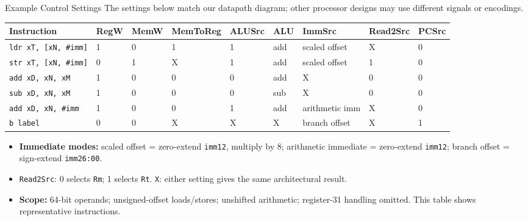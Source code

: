\documentclass[aspectratio=169,11pt,t]{beamer}
\newcommand{\key}[1]{\textbf{#1}}
\newcommand{\code}[1]{\texttt{#1}}
\begin{document}
\begin{frame}{Example Control Settings}
\scriptsize
The settings below match our datapath diagram; other processor designs may use different signals or encodings.
\begin{center}
\renewcommand{\arraystretch}{1.28}
\setlength{\tabcolsep}{5pt}
\begin{adjustbox}{max width=\textwidth}
\begin{tabular}{lllllllll}
\toprule
\rowcolor{white}
\textbf{Instruction} & \textbf{RegW} & \textbf{MemW} & \textbf{MemToReg} & \textbf{ALUSrc} & \textbf{ALU} & \textbf{ImmSrc} & \textbf{Read2Src} & \textbf{PCSrc} \\
\midrule
\code{ldr xT, [xN, \#imm]} & 1 & 0 & 1 & 1 & add & scaled offset & X & 0 \\
\code{str xT, [xN, \#imm]} & 0 & 1 & X & 1 & add & scaled offset & 1 & 0 \\
\code{add xD, xN, xM} & 1 & 0 & 0 & 0 & add & X & 0 & 0 \\
\code{sub xD, xN, xM} & 1 & 0 & 0 & 0 & sub & X & 0 & 0 \\
\code{add xD, xN, \#imm} & 1 & 0 & 0 & 1 & add & arithmetic imm & X & 0 \\
\code{b label} & 0 & 0 & X & X & X & branch offset & X & 1 \\
\bottomrule
\end{tabular}
\end{adjustbox}
\end{center}
\vspace{0.12cm}
\scriptsize
\begin{itemize}\setlength{\itemsep}{3pt}
\item \key{Immediate modes:} scaled offset = zero-extend \code{imm12}, multiply by 8; arithmetic immediate = zero-extend \code{imm12}; branch offset = sign-extend \code{imm26:00}.
\item \code{Read2Src}: 0 selects \code{Rm}; 1 selects \code{Rt}. \code{X}: either setting gives the same architectural result.
\item \key{Scope:} 64-bit operands; unsigned-offset loads/stores; unshifted arithmetic; register-31 handling omitted. This table shows representative instructions.
\end{itemize}
\end{frame}
\end{document}
